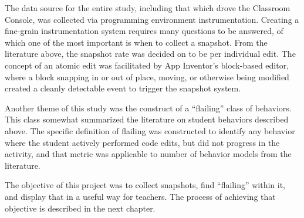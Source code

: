 The data source for the entire study, including that which drove the Classroom Console, was collected via programming environment instrumentation. Creating a fine-grain instrumentation system requires many questions to be answered, of which one of the most important is when to collect a snapshot. From the literature above, the snapshot rate was decided on to be per individual edit. The concept of an atomic edit was facilitated by App Inventor's block-based editor, where a block snapping in or out of place, moving, or otherwise being modified created a cleanly detectable event to trigger the snapshot system. 

Another theme of this study was the construct of a ``flailing'' class of behaviors. This class somewhat summarized the literature on student behaviors described above. The specific definition of flailing was constructed to identify any behavior where the student actively performed code edits, but did not progress in the activity, and that metric was applicable to number of behavior models from the literature.

The objective of this project was to collect snapshots, find ``flailing'' within it, and display that in a useful way for teachers. The process of achieving that objective is described in the next chapter.

